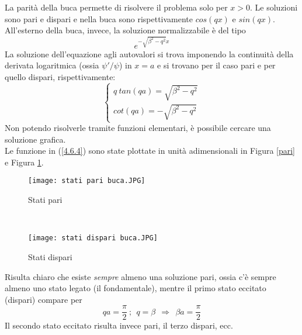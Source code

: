 \documentclass[twoside]{article}
\begin{document}
La parità della buca permette di risolvere il problema solo per $x>0$. Le soluzioni sono pari e dispari e nella buca sono rispettivamente $cos(qx)$ e $sin(qx)$.
\\
All'esterno della buca, invece, la soluzione normalizzabile è del tipo
\begin{equation*}
    e^{-\sqrt{\beta^2 - q^2}x}
\end{equation*}
La soluzione dell'equazione agli autovalori si trova imponendo la continuità della derivata logaritmica (ossia $\psi'/\psi$) in $x=a$ e si trovano per il caso pari e per quello dispari, rispettivamente:
\begin{equation} \label{4.6.4}
     \left \{ \begin{array}{lr}
           q \ tan(qa)=\sqrt{\beta^2 - q^2} \\
         cot(qa)=-\sqrt{\beta^2 - q^2}
        \end{array}
    \right.
\end{equation}
Non potendo risolverle tramite funzioni elementari, è possibile cercare una soluzione grafica.
\\
Le funzione in (\ref{4.6.4}) sono state plottate in unità adimensionali in Figura \ref{pari} e Figura \ref{dispari}.

\newpage

\begin{figure}[!h]
\begin{minipage}[b]{8.5cm}
\centering
\texttt{[image: stati pari buca.JPG]}
\caption{Stati pari} \label{pari}
\end{minipage}
\ \hspace{2mm} \hspace{3mm} \
\begin{minipage}[b]{8.5cm}
\centering
\texttt{[image: stati dispari buca.JPG]}
\caption{Stati dispari} \label{dispari}
\end{minipage}
\end{figure}


Risulta chiaro che esiste \textit{sempre} almeno una soluzione pari, ossia c'è sempre almeno uno stato legato (il fondamentale), mentre il primo stato eccitato (dispari) compare per
\begin{equation*}
    qa=\frac{\pi}{2} \ ; \ \ q=\beta \ \ \Rightarrow \ \ \beta a =\frac{\pi}{2}
\end{equation*}
Il secondo stato eccitato risulta invece pari, il terzo dispari, ecc.

\newpage
\end{document}
